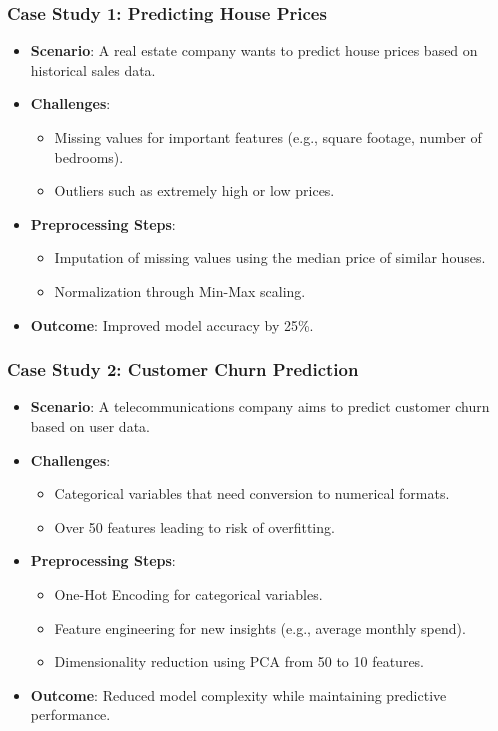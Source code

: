 \documentclass[aspectratio=169]{beamer}
\begin{document}
\begin{frame}[fragile]
    \frametitle{Case Study 1: Predicting House Prices}
    \begin{itemize}
        \item \textbf{Scenario}: A real estate company wants to predict house prices based on historical sales data.
        \item \textbf{Challenges}:
        \begin{itemize}
            \item Missing values for important features (e.g., square footage, number of bedrooms).
            \item Outliers such as extremely high or low prices.
        \end{itemize}
        \item \textbf{Preprocessing Steps}:
        \begin{itemize}
            \item Imputation of missing values using the median price of similar houses.
            \item Normalization through Min-Max scaling.
        \end{itemize}
        \item \textbf{Outcome}: Improved model accuracy by 25\%.
    \end{itemize}
\end{frame}

\begin{frame}[fragile]
    \frametitle{Case Study 2: Customer Churn Prediction}
    \begin{itemize}
        \item \textbf{Scenario}: A telecommunications company aims to predict customer churn based on user data.
        \item \textbf{Challenges}:
        \begin{itemize}
            \item Categorical variables that need conversion to numerical formats.
            \item Over 50 features leading to risk of overfitting.
        \end{itemize}
        \item \textbf{Preprocessing Steps}:
        \begin{itemize}
            \item One-Hot Encoding for categorical variables.
            \item Feature engineering for new insights (e.g., average monthly spend).
            \item Dimensionality reduction using PCA from 50 to 10 features.
        \end{itemize}
        \item \textbf{Outcome}: Reduced model complexity while maintaining predictive performance.
    \end{itemize}
\end{frame}
\end{document}
